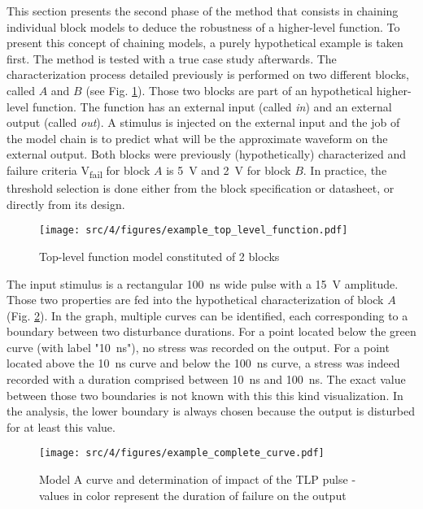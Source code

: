 This section presents the second phase of the method that consists in chaining individual block models to deduce the robustness of a higher-level function.
To present this concept of chaining models, a purely hypothetical example is taken first.
The method is tested with a true case study afterwards.
The characterization process detailed previously is performed on two different blocks, called $A$ and $B$ (see Fig. \ref{example_toplevel_function}).
Those two blocks are part of an hypothetical higher-level function.
The function has an external input (called \textit{in}) and an external output (called \textit{out}).
A stimulus is injected on the external input and the job of the model chain is to predict what will be the approximate waveform on the external output.
Both blocks were previously (hypothetically) characterized and failure criteria V\textsubscript{fail} for block $A$ is \SI{5}{\volt} and \SI{2}{\volt} for block $B$.
In practice, the threshold selection is done either from the block specification or datasheet, or directly from its design.

\begin{figure}[!h]
  \centering
  \texttt{[image: src/4/figures/example\_top\_level\_function.pdf]}
  \caption{Top-level function model constituted of 2 blocks}
  \label{example_toplevel_function}
\end{figure}

The input stimulus is a rectangular \SI{100}{\nano\second} wide pulse with a \SI{15}{\volt} amplitude.
Those two properties are fed into the hypothetical characterization of block $A$ (Fig. \ref{example_complete_curve}).
In the graph, multiple curves can be identified, each corresponding to a boundary between two disturbance durations.
For a point located below the green curve (with label "\SI{10}{\nano\second}"), no stress was recorded on the output.
For a point located above the \SI{10}{\nano\second} curve and below the \SI{100}{\nano\second} curve, a stress was indeed recorded with a duration comprised between \SI{10}{\nano\second} and \SI{100}{\nano\second}.
The exact value between those two boundaries is not known with this this kind visualization.
In the analysis, the lower boundary is always chosen because the output is disturbed for at least this value.

\begin{figure}[!h]
  \centering
  \texttt{[image: src/4/figures/example\_complete\_curve.pdf]}
  \caption{Model A curve and determination of impact of the TLP pulse - values in color represent the duration of failure on the output}
  \label{example_complete_curve}
\end{figure}

